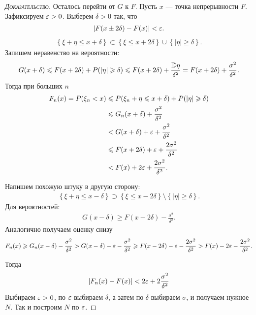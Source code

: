 \documentclass[../main.tex]{subfiles}
\begin{document}
\begin{proof}[\normalfont\textsc{Доказательство}]
 Осталось перейти от $ G $ к $ F $. Пусть $ x $ --- точка непрерывности $ F $. Зафиксируем $ \varepsilon  > 0 $. Выберем $ \delta > 0 $ так, что 
 \begin{align*}
  \left| F(x \pm 2\delta) - F(x) \right| < \varepsilon.
 \end{align*}
 \begin{align*}
  \left\{ \xi+\eta \leqslant x  + \delta \right\} \subset \left\{ \xi \leqslant x + 2\delta \right\} \cup \left\{ \left| \eta \right| \geqslant \delta \right\}.
 \end{align*} Запишем неравенство на вероятности:
 \begin{align*}
  G(x+\delta) \leqslant F(x+2\delta) + P(\left| \eta \right| \geqslant \delta) \leqslant F(x+2\delta) + \frac{\mathbb D \eta}{\delta^{2}} = F(x + 2\delta) + \frac{\sigma^2}{\delta^2}. 
 \end{align*} 
 Тогда при больших $n$
 \begin{align*}
  F_n(x) = P(\xi_n < x) &\leqslant P(\xi_n + \eta \leqslant x + \delta) + P(|\eta| \geqslant \delta) \\
  &\leqslant G_n(x+\delta) + \frac{\sigma^{2}}{\delta^{2}} \\
  &< G(x+\delta) + \varepsilon + \frac{\sigma^{2}}{\delta^{2}} \\
  &\leqslant F(x+2\delta) + \varepsilon + \frac{2\sigma^{2}}{\delta^{2}} \\
  &< F(x) + 2\varepsilon + \frac{2\sigma^{2}}{\delta^{2}}.
 \end{align*}

 Напишем похожую штуку в другую сторону:
 \begin{align*}
  \left\{ \xi +\eta \leqslant x - \delta \right\} \supset \left\{ \xi \leqslant x - 2\delta \right\} \setminus \left\{ \left| \eta \right| \geqslant \delta \right\}.
 \end{align*} Для вероятностей:
 \begin{align*}
  G(x-\delta) \geqslant F(x - 2\delta) - \frac{\sigma^{2}}{\delta^{2}}.
 \end{align*}  Аналогично получаем оценку снизу 
 \begin{align*}
  F_n(x) \geqslant G_n(x - \delta) - \frac{\sigma^{2}}{\delta^{2}} > G(x-\delta) - \varepsilon - \frac{\sigma^{2}}{\delta^{2}} \geqslant F(x - 2\delta) - \varepsilon - \frac{2\sigma^{2}}{\delta^{2}}  > F(x) - 2\varepsilon - \frac{2\sigma^{2}}{\delta^{2}}.
 \end{align*}

 Тогда
 \begin{align*}
  \left| F_n(x) - F(x) \right| < 2\varepsilon + 2 \frac{\sigma^{2}}{\delta^{2}}
 \end{align*} Выбираем $ \varepsilon > 0$, по $ \varepsilon $ выбираем $ \delta $,  а затем по $ \delta $ выбираем $ \sigma $, и получаем нужное $ N $. Так и построим $ N $ по $ \varepsilon $.

\end{proof}
\end{document}
